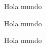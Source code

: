 \documentclass{article}
\begin{document}
  \begin{flushleft}
    Hola mundo
  \end{flushleft}

  \begin{flushright}
    Hola mundo
  \end{flushright}

  \begin{center}
    Hola mundo
  \end{center}
\end{document}
